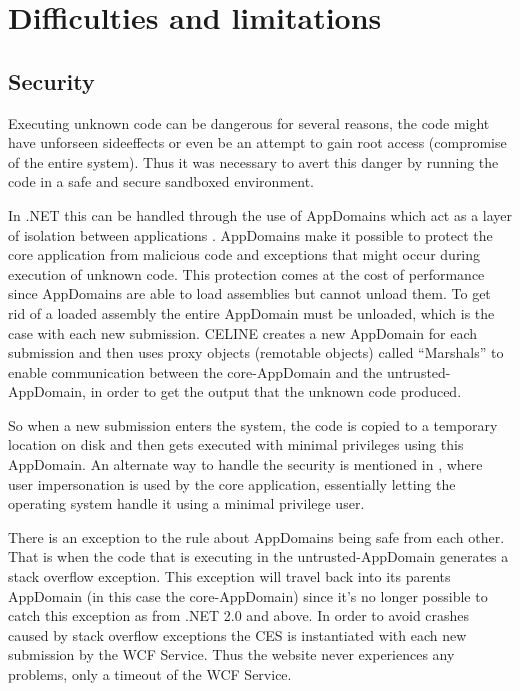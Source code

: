 \section{Difficulties and limitations}

\subsection{Security} \label{subsec:security}
Executing unknown code can be dangerous for several reasons, the code might have unforseen sideeffects or even be an attempt to gain root access (compromise of the entire system). Thus it was necessary to avert this danger by running the code in a safe and secure sandboxed environment.

In .NET this can be handled through the use of AppDomains which act as a layer of isolation between applications \cite{ApplicationDomains}. AppDomains make it possible to protect the core application from malicious code and exceptions that might occur during execution of unknown code. This protection comes at the cost of performance since AppDomains are able to load assemblies but cannot unload them. To get rid of a loaded assembly the entire AppDomain must be unloaded, which is the case with each new submission. CELINE creates a new AppDomain for each submission and then uses proxy objects (remotable objects) called ``Marshals'' \cite{Marshals} to enable communication between the core-AppDomain and the untrusted-AppDomain, in order to get the output that the unknown code produced. 

So when a new submission enters the system, the code is copied to a temporary location on disk and then gets executed with minimal privileges using this AppDomain. An alternate way to handle the security is mentioned in \cite{Suleman}, where user impersonation is used by the core application, essentially letting the operating system handle it using a minimal privilege user.

There is an exception to the rule about AppDomains being safe from each other. That is when the code that is executing in the untrusted-AppDomain generates a stack overflow exception. This exception will travel back into its parents AppDomain (in this case the core-AppDomain) since it's no longer possible to catch this exception as from .NET 2.0 and above. In order to avoid crashes caused by stack overflow exceptions the CES is instantiated with each new submission by the WCF Service. Thus the website never experiences any problems, only a timeout of the WCF Service.


